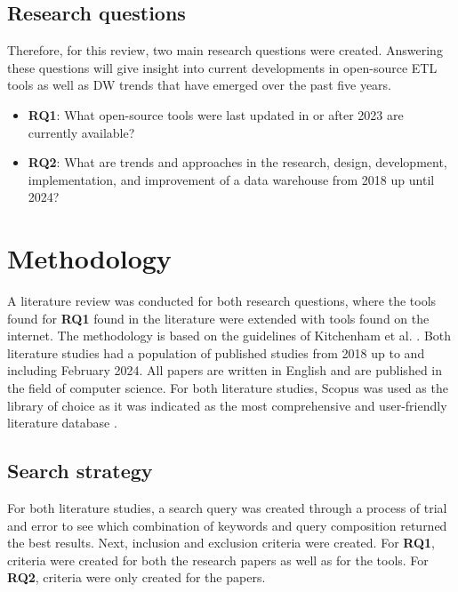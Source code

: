 \documentclass[11pt]{article}
\begin{document}
\subsection{Research questions}
Therefore, for this review, two main research questions were created. Answering these questions will give insight into current developments in open-source ETL tools as well as DW trends that have emerged over the past five years.

\begin{itemize}
    \item \textbf{RQ1}: What open-source tools were last updated in or after 2023 are currently available?
    \item \textbf{RQ2}: What are trends and approaches in the research, design, development, implementation, and improvement of a data warehouse from 2018 up until 2024?
\end{itemize}


\section{Methodology}
\label{methodology}
A literature review was conducted for both research questions, where the tools found for \textbf{RQ1} found in the literature were extended with tools found on the internet. The methodology is based on the guidelines of Kitchenham et al. \cite{kitchenham2015evidence}. Both literature studies had a population of published studies from 2018 up to and including February 2024. All papers are written in English and are published in the field of computer science. For both literature studies, Scopus was used as the library of choice as it was indicated as the most comprehensive and user-friendly literature database \cite{harzing2016google, mongeon2016journal}.\\

\subsection{Search strategy}
\label{searchstrat}
For both literature studies, a search query was created through a process of trial and error to see which combination of keywords and query composition returned the best results. Next, inclusion and exclusion criteria were created. For \textbf{RQ1}, criteria were created for both the research papers as well as for the tools. For \textbf{RQ2}, criteria were only created for the papers. \\
\end{document}
